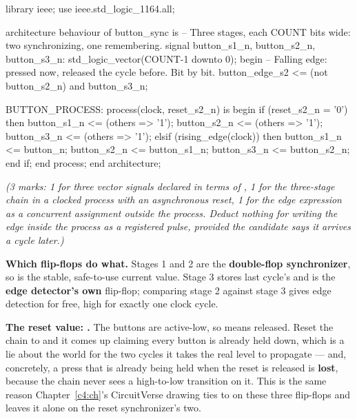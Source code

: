 
\begin{vhdlcode}
library ieee;
use ieee.std_logic_1164.all;

architecture behaviour of button_sync is
-- Three stages, each COUNT bits wide: two synchronizing, one remembering.
signal button_s1_n, button_s2_n, button_s3_n: std_logic_vector(COUNT-1 downto 0);
begin
    -- Falling edge: pressed now, released the cycle before. Bit by bit.
    button_edge_s2 <= (not button_s2_n) and button_s3_n;

    BUTTON_PROCESS: process(clock, reset_s2_n) is
    begin
        if (reset_s2_n = '0') then
            button_s1_n <= (others => '1');
            button_s2_n <= (others => '1');
            button_s3_n <= (others => '1');
        elsif (rising_edge(clock)) then
            button_s1_n <= button_n;
            button_s2_n <= button_s1_n;
            button_s3_n <= button_s2_n;
        end if;
    end process;
end architecture;
\end{vhdlcode}

{\itshape (3 marks: 1 for three vector signals declared in terms of , 1 for the
three-stage chain in a clocked process with an asynchronous reset, 1 for the edge expression as a
concurrent assignment outside the process. Deduct nothing for writing the edge inside the process
as a registered pulse, provided the candidate says it arrives a cycle later.)\par}

\medskip
\textbf{Which flip-flops do what.} Stages 1 and 2 are the \textbf{double-flop synchronizer}, so
 is the stable, safe-to-use current value. Stage 3 stores last cycle's
 and is the \textbf{edge detector's own} flip-flop; comparing stage 2 against
stage 3 gives edge detection for free, high for exactly one clock cycle. 

\textbf{The reset value: .} The buttons are active-low, so  means
released. Reset the chain to  and it comes up claiming every button is already held down,
which is a lie about the world for the two cycles it takes the real level to propagate --- and,
concretely, a press that is already being held when the reset is released is \textbf{lost}, because
the chain never sees a high-to-low transition on it. This is the same reason Chapter~\ref{c4:ch}'s
CircuitVerse drawing ties  to  on these three flip-flops and leaves it alone on
the reset synchronizer's two. 

